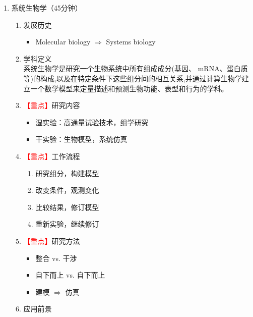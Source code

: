 \documentclass{TIJMUjiaoanLL}
\begin{document}
\begin{enumerate}
  \item 系统生物学（45分钟）
    \begin{enumerate}
      \item 发展历史
        \begin{itemize}
          \item Molecular biology $\Rightarrow$ Systems biology
        \end{itemize}
      \item 学科定义\\
        系统生物学是研究一个生物系统中所有组成成分(基因、 mRNA、蛋白质等)的构成,以及在特定条件下这些组分间的相互关系,并通过计算生物学建立一个数学模型来定量描述和预测生物功能、表型和行为的学科。
      \item \textcolor{red}{【重点】}研究内容
        \begin{itemize}
          \item 湿实验：高通量试验技术，组学研究
          \item 干实验：生物模型，系统仿真
        \end{itemize}
      \item \textcolor{red}{【重点】}工作流程
        \begin{enumerate}
          \item 研究组分，构建模型
          \item 改变条件，观测变化
          \item 比较结果，修订模型
          \item 重新实验，继续修订
        \end{enumerate}
      \item \textcolor{red}{【重点】}研究方法
        \begin{itemize}
          \item 整合 vs. 干涉 
          \item 自下而上 vs. 自下而上
          \item 建模 $\Rightarrow$ 仿真
        \end{itemize}
      \item 应用前景
    \end{enumerate}



\end{enumerate}
\end{document}
